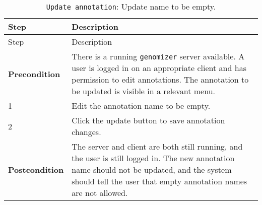 \begin{longtable}[c]{@{}ll@{}}
\caption{\texttt{Update\ annotation}: Update name to be
empty.}\tabularnewline
\toprule
\begin{minipage}[b]{0.31\columnwidth}\raggedright\strut
Step
\strut\end{minipage} &
\begin{minipage}[b]{0.63\columnwidth}\raggedright\strut
Description
\strut\end{minipage}\tabularnewline
\midrule
\endfirsthead
\toprule
\begin{minipage}[b]{0.31\columnwidth}\raggedright\strut
Step
\strut\end{minipage} &
\begin{minipage}[b]{0.63\columnwidth}\raggedright\strut
Description
\strut\end{minipage}\tabularnewline
\midrule
\endhead
\begin{minipage}[t]{0.31\columnwidth}\raggedright\strut
\textbf{Precondition}
\strut\end{minipage} &
\begin{minipage}[t]{0.63\columnwidth}\raggedright\strut
There is a running \texttt{genomizer} server available. A user is logged
in on an appropriate client and has permission to edit annotations. The
annotation to be updated is visible in a relevant menu.
\strut\end{minipage}\tabularnewline
\begin{minipage}[t]{0.31\columnwidth}\raggedright\strut
1
\strut\end{minipage} &
\begin{minipage}[t]{0.63\columnwidth}\raggedright\strut
Edit the annotation name to be empty.
\strut\end{minipage}\tabularnewline
\begin{minipage}[t]{0.31\columnwidth}\raggedright\strut
2
\strut\end{minipage} &
\begin{minipage}[t]{0.63\columnwidth}\raggedright\strut
Click the update button to save annotation changes.
\strut\end{minipage}\tabularnewline
\begin{minipage}[t]{0.31\columnwidth}\raggedright\strut
\textbf{Postcondition}
\strut\end{minipage} &
\begin{minipage}[t]{0.63\columnwidth}\raggedright\strut
The server and client are both still running, and the user is still
logged in. The new annotation name should not be updated, and the system
should tell the user that empty annotation names are not allowed.
\strut\end{minipage}\tabularnewline
\bottomrule
\end{longtable}

